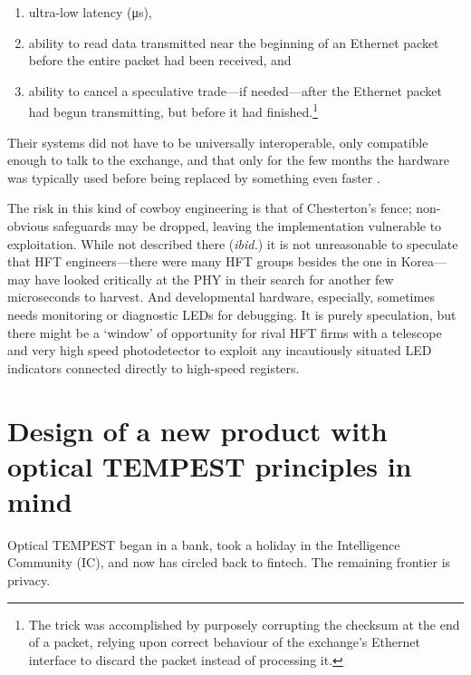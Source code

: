 \documentclass[conference]{IEEEtran}
\begin{document}
\begin{enumerate}
    \item ultra-low latency (\si{\micro\second}),
    \item ability to read data transmitted near the beginning of an Ethernet
        packet before the entire packet had been received, and
    \item ability to cancel a speculative trade---if needed---after the
        Ethernet packet had begun transmitting, but before it had
        finished.\footnote{The trick was accomplished by purposely corrupting
        the checksum at the end of a packet, relying upon correct behaviour
        of the exchange's Ethernet interface to discard the packet instead of
        processing it.}
\end{enumerate}

Their systems did not have to be universally interoperable, only compatible
enough to talk to the exchange, and that only for the few months the hardware
was typically used before being replaced by something even faster
\cite{Hurd2018a}.

The risk in this kind of cowboy engineering is that of Chesterton's fence;
non-obvious safeguards may be dropped, leaving the implementation vulnerable
to exploitation. While not described there ({\it ibid.}) it is not
unreasonable to speculate that HFT engineers---there were many HFT groups
besides the one in Korea---may have looked critically at the PHY in their
search for another few microseconds to harvest. And developmental hardware,
especially, sometimes needs monitoring or diagnostic LEDs for debugging. It
is purely speculation, but there might be a `window' of opportunity for rival
HFT firms with a telescope and very high speed photodetector to exploit any
incautiously situated LED indicators connected directly to high-speed
registers.

\section{Design of a new product with optical TEMPEST principles in mind}

Optical TEMPEST began in a bank, took a holiday in the Intelligence Community
(IC), and now has circled back to fintech. The remaining frontier is privacy.
\end{document}
